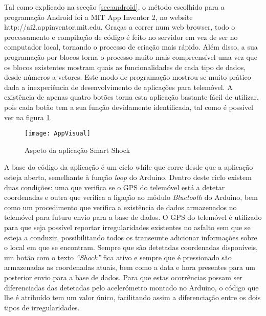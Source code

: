 Tal como explicado na secção \ref{sec:android}, o método escolhido para a programação Android foi a MIT App Inventor 2, no website http://ai2.appinventor.mit.edu.
Graças a correr num web browser, todo o processamento e compilação de código é feito no servidor em vez de ser no computador local, tornando o processo de criação mais rápido.
Além disso, a sua programação por blocos torna o processo muito mais compreensível uma vez que os blocos existentes mostram quais as funcionalidades de cada tipo de dados, desde números a vetores.
Este modo de programação mostrou-se muito prático dada a inexperiência de desenvolvimento de aplicações para telemóvel.
A existência de apenas quatro botões torna esta aplicação bastante fácil de utilizar, pois cada botão tem a sua função devidamente identificada, tal como é possível ver na figura \ref{fig:Aspeto_da_aplicação_Smart_Shock}.


\begin{figure}[!htbp]
	\centering
	\texttt{[image: AppVisual]}
	\caption{Aspeto da aplicação Smart Shock}
	\label{fig:Aspeto_da_aplicação_Smart_Shock}
\end{figure}

A base do código da aplicação é um ciclo while que corre desde que a aplicação esteja aberta, semelhante à função \emph{loop} do Arduino.
Dentro deste ciclo existem duas condições: uma que verifica se o GPS do telemóvel está a detetar coordenadas e outra que verifica a ligação ao módulo \emph{Bluetooth} do Arduino, bem como um procedimento que verifica a existência de dados armazenados no telemóvel para futuro envio para a base de dados.
O GPS do telemóvel é utilizado para que seja possível reportar irregularidades existentes no asfalto sem que se esteja a conduzir, possibilitando todos os transeunte adicionar informações sobre o local em que se encontram.
Sempre que são detetadas coordenadas disponíveis, um botão com o texto \emph{``Shock''} fica ativo e sempre que é pressionado são armazenadas as coordenadas atuais, bem como a data e hora presentes para um posterior envio para a base de dados.
Para que estas ocorrências possam ser diferenciadas das detetadas pelo acelerómetro montado no Arduino, o código que lhe é atribuído tem um valor único, facilitando assim a diferenciação entre os dois tipos de irregularidades.

